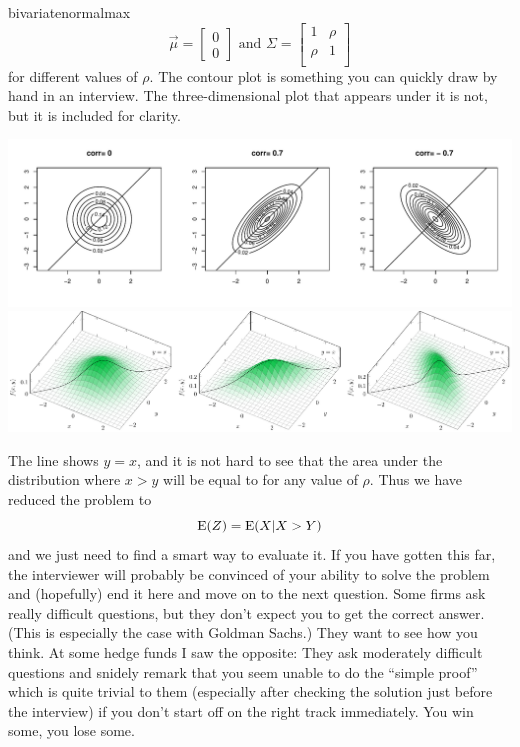 \begin{answer}{bivariatenormalmax}
\[
\vec{\mu}=
\begin{bmatrix}
  0    \\
  0
\end{bmatrix}
\text{ and }
\Sigma =
\begin{bmatrix}
  1    & \rho \\
  \rho & 1    \\
\end{bmatrix}
\]
for different values of $\rho$.
The contour plot is something you can quickly draw by hand in an interview.
The three-dimensional plot that appears under it is not, but it is included for clarity.
\begin{center}
  \includegraphics[width=\textwidth]{./plots/mvtnorm/mvrnorm.pdf}
  \includegraphics[width=\textwidth]{./plots/bivariatenorm/bivariatenorm.pdf}
\end{center}
The line shows $y=x$, and it is not hard to see that the area under the distribution where $x>y$ will be equal to  for any value of $\rho$.
Thus we have reduced the problem to
\[
\operatorname{\mathrm{E}}(Z) =  \operatorname{\mathrm{E}}(X|X > Y)
\]
and we just need to find a smart way to evaluate it.
If you have gotten this far, the interviewer will probably be convinced of your ability to solve the problem and (hopefully) end it here and move on to the next question.
Some firms  ask really difficult questions, but they don't expect you to get the correct answer.
(This is especially the case with Goldman Sachs.)
They want to see how you think.
At some hedge funds I saw the opposite: They ask moderately difficult questions and snidely remark that you seem unable to do the ``simple proof'' which is quite trivial to them (especially after checking the solution just before the interview) if you don't start off on the right track immediately.
You win some, you lose some.


\end{answer}
